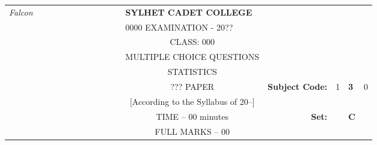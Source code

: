 \documentclass[12pt]{exam}
\begin{document}
\fi
\begin{table}[]
\begin{tabular}{lllllllllllcllll}
\textit{Falcon} &  &  &  &  &  &  &  &  &  &  & \multicolumn{1}{l}{\textbf{SYLHET CADET COLLEGE}} &                                             &                        &                                 &                        \\
                &  &  &  &  &  &  &  &  &  &  & \multicolumn{1}{l}{0000 EXAMINATION - 20??}       &                                             &                        & \multicolumn{1}{c}{}            &                        \\
                &  &  &  &  &  &  &  &  &  &  & CLASS: 000                                        &                                             &                        & \multicolumn{1}{c}{}            &                        \\
                &  &  &  &  &  &  &  &  &  &  & MULTIPLE CHOICE QUESTIONS                         &                                             &                        & \multicolumn{1}{c}{}            &                        \\
                &  &  &  &  &  &  &  &  &  &  & STATISTICS                                        &                                             &                        & \multicolumn{1}{r}{}            &                        \\ \cline{14-16} 
                &  &  &  &  &  &  &  &  &  &  & ??? PAPER                                         & \multicolumn{1}{r|}{\textbf{Subject Code:}} & \multicolumn{1}{l|}{1} & \multicolumn{1}{l|}{\textbf{3}} & \multicolumn{1}{l|}{0} \\ \cline{14-16} 
                &  &  &  &  &  &  &  &  &  &  & [According to the Syllabus of 20--]               & \multicolumn{1}{r}{}                        &                        &                                 &                        \\ \cline{15-15}
                &  &  &  &  &  &  &  &  &  &  & TIME – 00 minutes                                 & \multicolumn{1}{r}{\textbf{Set:}}           & \multicolumn{1}{l|}{}  & \multicolumn{1}{l|}{\textbf{C}} &                        \\ \cline{15-15}
                &  &  &  &  &  &  &  &  &  &  & FULL MARKS – 00                                   &                                             &                        &                                 &                       
\end{tabular}
\end{table}
\end{document}
